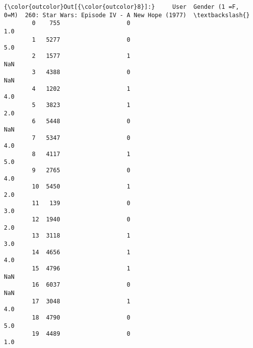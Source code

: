 \documentclass[11pt]{article}
\begin{document}
\begin{Verbatim}[commandchars=\\\{\}]
{\color{outcolor}Out[{\color{outcolor}8}]:}     User  Gender (1 =F, 0=M)  260: Star Wars: Episode IV - A New Hope (1977)  \textbackslash{}
        0    755                   0                                             1.0   
        1   5277                   0                                             5.0   
        2   1577                   1                                             NaN   
        3   4388                   0                                             NaN   
        4   1202                   1                                             4.0   
        5   3823                   1                                             2.0   
        6   5448                   0                                             NaN   
        7   5347                   0                                             4.0   
        8   4117                   1                                             5.0   
        9   2765                   0                                             4.0   
        10  5450                   1                                             2.0   
        11   139                   0                                             3.0   
        12  1940                   0                                             2.0   
        13  3118                   1                                             3.0   
        14  4656                   1                                             4.0   
        15  4796                   1                                             NaN   
        16  6037                   0                                             NaN   
        17  3048                   1                                             4.0   
        18  4790                   0                                             5.0   
        19  4489                   0                                             1.0   
        

\end{Verbatim}
\end{document}

